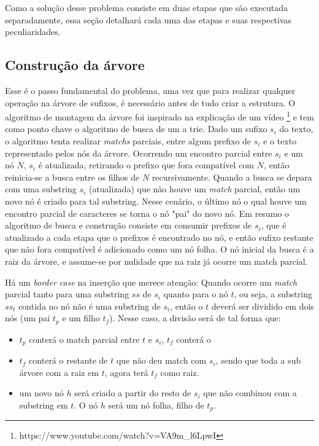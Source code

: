 Como a solução desse problema consiste em duas etapas que são executada
separadamente, essa seção detalhará cada uma das etapas e suas respectivas
peculiaridades.

\subsection{Construção da árvore} 
Esse é o passo fundamental do problema, uma vez que para realizar qualquer
operação na árvore de sufixos, é necessário antes de tudo criar a
estrutura.
O algoritmo de montagem da árvore foi inspirado na explicação de um vídeo
\footnote{https://www.youtube.com/watch?v=VA9m\_l6LpwI}
e tem como ponto chave o algoritmo de busca de um a trie.
Dado um sufixo $s_i$ do texto, o algoritmo tenta realizar \textit{matchs}
parciais, entre algum prefixo de $s_i$ e o texto representado pelos nós
da árvore.
Ocorrendo um encontro parcial entre $s_i$ e um nó $N$, $s_i$ é atualizada, retirando
o prefixo que fora compatível com $N$, então reinicia-se a busca entre os
filhos de $N$ recursivamente.
Quando a busca se depara com uma substring $s_i$ (atualizada) que não
houve um \textit{match} parcial, então um novo nó é criado para tal substring.
Nesse cenário, o último nó o qual houve um encontro parcial de caracteres se
torna o nó "pai" do novo nó.
Em resumo o algoritmo de busca e construção consiste em consumir prefixos de
$s_i$, que é atualizado a cada etapa que o prefixos é encontrado no nó,
e então sufixo restante que não fora compatível é adicionado como um nó folha.
O nó inicial da busca é a raiz da árvore, e assume-se por nulidade que na raiz
já ocorre um match parcial.

Há um \textit{border case} na inserção que merece atenção:
Quando ocorre um \textit{match} parcial tanto para uma substring $ss$ de $s_i$
quanto para o nó $t$, ou seja, a substring $ss_t$ contida no nó não é uma
substring de $s_i$, então o $t$ deverá ser dividido em dois nós (um pai $t_p$ e
um filho $t_f$).
Nesse caso, a divisão será de tal forma que:
\begin{itemize}
    \item $t_p$ conterá o match parcial entre $t$ e $s_i$, $t_f$ conterá o
    \item $t_f$ conterá o restante de $t$ que não deu match com $s_i$, sendo que
    toda a sub árvore com a raiz em $t$, agora terá $t_f$ como raiz.
    \item um novo nó $h$ será criado a partir do resto de $s_i$ que não combinou
    com a substring em $t$. O nó $h$ será um nó folha, filho de $t_p$.
\end{itemize}

